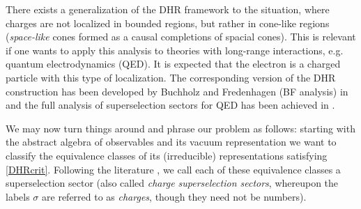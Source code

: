 \documentclass[12pt]{article}
\newcommand{\1}{\mathds{1}}                         %
\newcommand{\CC}{\mathbb{C}}           %
\newcommand{\Hcal}{\mathcal {H}}
\newcommand{\Ac}{{\mathcal{A}}}
\begin{document}
There exists a generalization of the DHR framework to the situation, where charges are not localized in bounded regions, but rather in cone-like regions (\emph{space-like} cones formed as a causal completions of spacial cones). This is relevant if one wants to apply this analysis to theories with long-range interactions, e.g. quantum electrodynamics (QED). It is expected that the electron is a charged particle with this type of localization. The corresponding version of the DHR construction has been developed by Buchholz and Fredenhagen (BF analysis) in \cite{BF82} and the full analysis of superselection sectors for QED has been achieved in \cite{BR14}.

We may now turn things around and phrase  our problem as follows: starting with the abstract algebra of observables and its vacuum representation we want to classify the equivalence classes of its (irreducible) representations satisfying \eqref{DHRcrit}. Following the literature \cite{Haag,DHR1,DHR2,DHR3,DHR4}, we call each of these equivalence classes a superselection sector (also called \textit{charge superselection sectors}, whereupon the labels $\sigma$ are referred to as \textit{charges}, though they need not be numbers). 
%
% 
 
\end{document}
